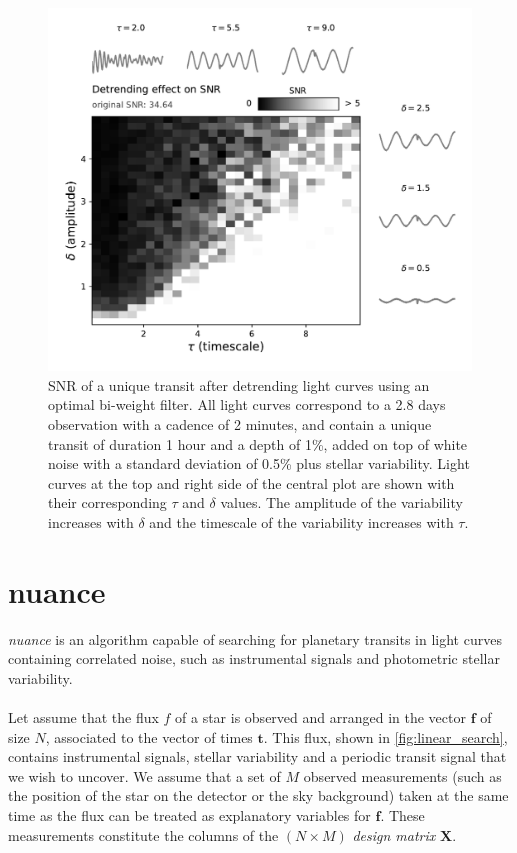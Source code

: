 \documentclass[modern]{aastex631}
\begin{document}
\begin{figure}[H]
    \begin{centering}
        \includegraphics[width=0.9\linewidth]{../workflows/cleaning_snr/figures/result.pdf}
        \caption{SNR of a unique transit after detrending light curves using an optimal bi-weight filter. All light curves correspond to a 2.8 days observation with a cadence of 2 minutes, and contain a unique transit of duration 1 hour and a depth of 1\%, added on top of white noise with a standard deviation of 0.5\% plus stellar variability. Light curves at the top and right side of the central plot are shown with their corresponding $\tau$ and $\delta$ values. The amplitude of the variability increases with $\delta$ and the timescale of the variability increases with $\tau$.}
        \label{fig:snr_detrend}
    \end{centering}
\end{figure}


\newpage
\section{\textsf{nuance}}\label{nuance}

\textit{nuance} is an algorithm capable of searching for planetary transits in light curves containing correlated noise, such as instrumental signals and photometric stellar variability.
\\\\
Let assume that the flux $f$ of a star is observed and arranged in the vector $\bm{f}$ of size $N$, associated to the vector of times $\bm{t}$. This flux, shown in \autoref{fig:linear_search}, contains instrumental signals, stellar variability and a periodic transit signal that we wish to uncover. We assume that a set of $M$ observed measurements (such as the position of the star on the detector or the sky background) taken at the same time as the flux can be treated as explanatory variables for $\bm{f}$. These measurements constitute the columns of the $(N\times M)$ \textit{design matrix} $\bm{X}$.\\\\
\end{document}
